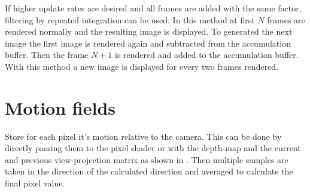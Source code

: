 If higher update rates are desired and all frames are added with the same factor, filtering by repeated integration can be used.\cite{Heckbert.1986}
In this method at first $N$ frames are rendered normally and the resulting image is displayed.
To generated the next image the first image is rendered again and subtracted from the accumulation buffer.
Then the frame $N+1$ is rendered and added to the accumulation buffer.
With this method a new image is displayed for every two frames rendered.\cite{Haeberli.1990}

\section{Motion fields}
Store for each pixel it's motion relative to the camera.
This can be done by directly passing them to the pixel shader or with the depth-map and the current and previous view-projection matrix as shown in \cite{Rosado.2008}.
Then multiple samples are taken in the direction of the calculated direction and averaged to calculate the final pixel value.
\cite{Sousa.2008}